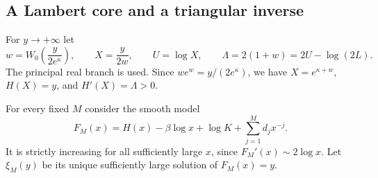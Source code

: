 \documentclass[11pt,letterpaper]{article}
\theoremstyle{definition}\newtheorem{definition}[theorem]{Definition}
\theoremstyle{remark}\newtheorem{remark}[theorem]{Remark}
\begin{document}
\subsection{A Lambert core and a triangular inverse}
For $y\to+\infty$ let
\begin{equation}\label{spc:eq:core}
 w=W_0\!\left(\frac{y}{2e^\kappa}\right),\qquad
 X=\frac{y}{2w},\qquad U=\log X,\qquad
 \Lambda=2(1+w)=2U-\log(2L).
\end{equation}
The principal real branch is used. Since $we^w=y/(2e^\kappa)$, we have $X=e^{\kappa+w}$, $H(X)=y$, and $H'(X)=\Lambda>0$.

For every fixed $M$ consider the smooth model
\begin{equation}\label{spc:eq:FM}
 F_M(x)=H(x)-\beta\log x+\log K+\sum_{j=1}^Md_jx^{-j}.
\end{equation}
It is strictly increasing for all sufficiently large $x$, since $F_M'(x)\sim2\log x$. Let $\xi_M(y)$ be its unique sufficiently large solution of $F_M(x)=y$.
\end{document}
